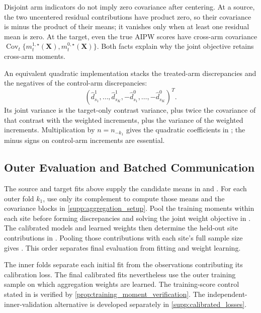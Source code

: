\documentclass[12pt]{article}
\begin{document}
Disjoint arm indicators do not imply zero covariance after centering. At a source, the two uncentered residual contributions have product zero, so their covariance is minus the product of their means; it vanishes only when at least one residual mean is zero. At the target, even the true AIPW scores have cross-arm covariance $\operatorname{Cov}_t\{m_t^{1,\star}(\boldsymbol X),m_t^{0,\star}(\boldsymbol X)\}$. Both facts explain why the joint objective retains cross-arm moments.

An equivalent quadratic implementation stacks the treated-arm discrepancies and the negatives of the control-arm discrepancies:
\[
(\widehat d_{s_1}^1,\ldots,\widehat d_{s_K}^1,-\widehat d_{s_1}^0,\ldots,-\widehat d_{s_K}^0)^T.
\]
Its joint variance is the target-only contrast variance, plus twice the covariance of that contrast with the weighted increments, plus the variance of the weighted increments. Multiplication by $n=n_{-k_1}$ gives the quadratic coefficients in ; the minus signs on control-arm increments are essential.

\subsection{Outer Evaluation and Batched Communication}\label{supp:primary_evaluation}
The source and target fits above supply the candidate means in  and . For each outer fold $k_1$, use only its complement to compute those means and the covariance blocks in \cref{supp:aggregation_setup}. Pool the training moments within each site before forming discrepancies and solving the joint weight objective in . The calibrated models and learned weights then determine the held-out site contributions in . Pooling those contributions with each site's full sample size gives . This order separates final evaluation from fitting and weight learning.

The inner folds separate each initial fit from the observations contributing its calibration loss. The final calibrated fits nevertheless use the outer training sample on which aggregation weights are learned. The training-score control stated in  is verified by \cref{prop:training_moment_verification}. The independent-inner-validation alternative is developed separately in \cref{supp:calibrated_losses}.
\end{document}
